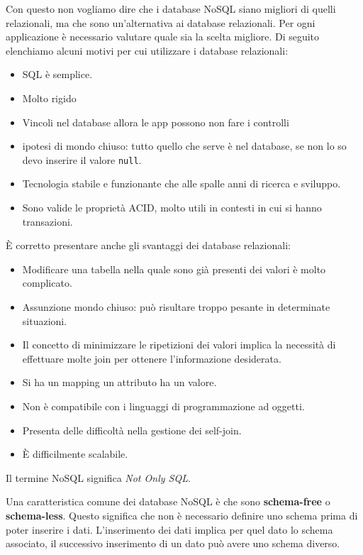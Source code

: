 Con questo non vogliamo dire che i database NoSQL siano migliori di quelli
relazionali, ma che sono un'alternativa ai database relazionali. Per ogni
applicazione è necessario valutare quale sia la scelta migliore. Di seguito
elenchiamo alcuni motivi per cui utilizzare i database relazionali:
\begin{itemize}
      \item SQL è semplice.
      \item Molto rigido
      \item Vincoli nel database allora le app possono non fare i controlli
      \item ipotesi di mondo chiuso: tutto quello che serve è nel database, se non
            lo so devo inserire il valore \texttt{null}.
      \item Tecnologia stabile e funzionante che alle spalle anni di ricerca e
            sviluppo.
      \item Sono valide le proprietà ACID, molto utili in contesti in cui si
            hanno transazioni.
\end{itemize}
È corretto presentare anche gli svantaggi dei database relazionali:
\begin{itemize}
      \item Modificare una tabella nella quale sono già presenti dei valori è molto
            complicato.
      \item Assunzione mondo chiuso: può risultare troppo pesante in determinate
            situazioni.
      \item Il concetto di minimizzare le ripetizioni dei valori implica la necessità
            di effettuare molte join per ottenere l'informazione desiderata.
      \item Si ha un mapping un attributo ha un valore.
      \item Non è compatibile con i linguaggi di programmazione ad oggetti.
      \item Presenta delle difficoltà nella gestione dei self-join.
      \item È difficilmente scalabile.
\end{itemize}
\begin{nota}
      Il termine NoSQL significa \textit{Not Only SQL}.
\end{nota}
Una caratteristica comune dei database NoSQL è che sono \textbf{schema-free} o
\textbf{schema-less}. Questo significa che non è necessario definire uno schema
prima di poter inserire i dati. L'inserimento dei dati implica per quel dato lo
schema associato, il successivo inserimento di un dato può avere uno schema diverso.

